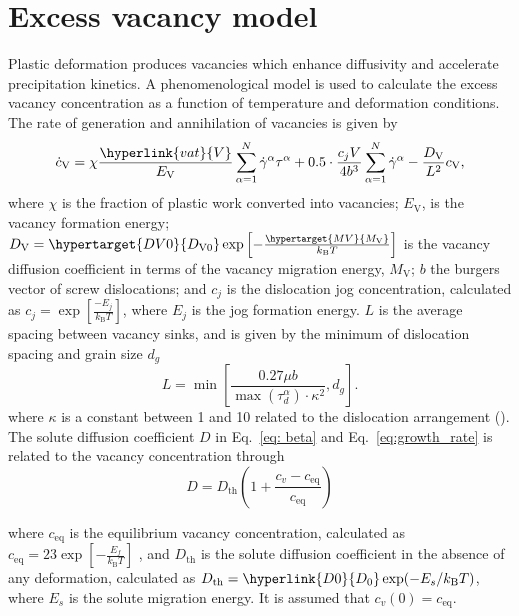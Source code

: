 \documentclass[11pt]{scrartcl}
\newcommand{\eref}[1]{Eq.~\eqref{#1}}
\newcommand{\kB}{\ensuremath{k_\text{B}}}
\begin{document}
\section{Excess vacancy model}
Plastic deformation produces vacancies which enhance diffusivity and accelerate precipitation kinetics. A phenomenological model \cite{Robson2020, Militzer1994, Bignon2022} is used to calculate the excess vacancy concentration as a function of temperature and deformation conditions. The rate of generation and annihilation of vacancies is given by
%
\begin{equation}
\label{eq: vacancyrate}
\dot{c}_\text{V} = \chi \frac{\hyperlink{vat}{V}}{E_\text{V}} \sum_{\alpha = 1}^{N} \dot{\gamma}^{\alpha} \tau^{\alpha}  + 0.5\cdot\frac{c_{j}V}{4b^{3}}  \sum_{\alpha = 1}^{N} \dot{\gamma}^{\alpha}   - \frac{D_\text{V}}{L^2} c_\text{V},
\end{equation} 
where \hypertarget{generation}{$\chi$} is the fraction of plastic work converted into vacancies;  \hypertarget{EV}{$E_\text{V}$}, is the vacancy formation energy; $D_\text{V} = \hypertarget{DV0}{D_\text{V0}} \exp\left[-\frac{\hypertarget{MV}{M_\text{V}}}{\kB T}\right]$ is the vacancy diffusion coefficient in terms of the vacancy migration energy, $M_\text{V}$; \hypertarget{b}{$b$} the burgers vector of screw dislocations; and $c_{j}$ is the dislocation jog concentration, calculated as $c_j=\exp\left[\frac{-E_j}{\kB T}\right]$, where \hypertarget{Ej}{$E_j$} is the jog formation energy.
$L$ is the average spacing between vacancy sinks, and is given by the minimum of dislocation spacing and grain size \hyperlink{dg}{$d_{g}$}
%
\begin{equation}
\label{eq: vacancysink}
L = \min\left[\frac{0.27 \mu b}{\max(\tau_d^{\alpha}) \cdot \kappa^{2}}, d_g\right].
\end{equation} 
%
where \hypertarget{kappa}{$\kappa$} is a constant between 1 and 10 related to the dislocation arrangement (\cite{Bignon2022, Robson2020}).
The solute diffusion coefficient $D$ in \eref{eq: beta} and \eref{eq:growth_rate} is related to the vacancy concentration through
%
\begin{equation}
\label{eq: diffusion}
D = D_{\text{th}}(1+\frac{c_v-c{_\text{eq}}}{c_{\text{eq}}})
\end{equation} 

where $c{_\text{eq}}$ is the equilibrium vacancy concentration, calculated as $c{_\text{eq}}=23\exp[-\frac{E_f}{\kB T}]$ \cite{Bignon2022}, and $D_{\text{th}}$ is the solute diffusion coefficient in the absence of any deformation, calculated as $D_{\text{th}}=\hyperlink{D0}{D_0}\exp(-E_s/\kB T)$, where \hyperlink{Es}{$E_s$} is the solute migration energy. It is assumed that $c_v(0)=c{_\text{eq}}$.
\end{document}

